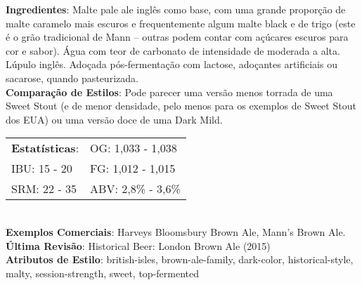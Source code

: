 \textbf{Ingredientes}: Malte pale ale inglês como base, com uma grande proporção de malte caramelo mais escuros e frequentemente algum malte black e de trigo (este é o grão tradicional de Mann – outras podem contar com açúcares escuros para cor e sabor). Água com teor de carbonato de intensidade de moderada a alta. Lúpulo inglês. Adoçada pós-fermentação com lactose, adoçantes artificiais ou sacarose, quando pasteurizada. \\
\textbf{Comparação de Estilos}: Pode parecer uma versão menos torrada de uma Sweet Stout (e de menor densidade, pelo menos para os exemplos de Sweet Stout dos EUA) ou uma versão doce de uma Dark Mild. \\
\begin{tabular}{@{}p{35mm}p{35mm}@{}}
  \textbf{Estatísticas}: & OG: 1,033 - 1,038  \\
  IBU: 15 - 20  & FG: 1,012 - 1,015  \\
  SRM: 22 - 35 & ABV: 2,8\% - 3,6\%
\end{tabular}\\
\textbf{Exemplos Comerciais}: Harveys Bloomsbury Brown Ale, Mann's Brown Ale. \\
\textbf{Última Revisão}: Historical Beer: London Brown Ale (2015) \\
\textbf{Atributos de Estilo}: british-isles, brown-ale-family, dark-color, historical-style, malty, session-strength, sweet, top-fermented
